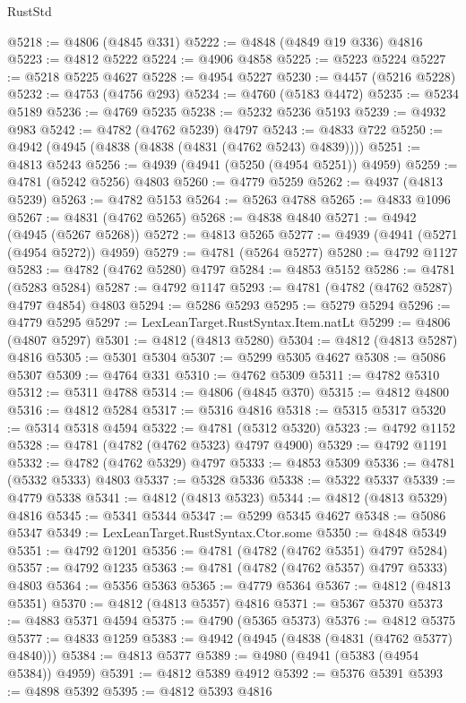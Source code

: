 \begin{lexlean}{RustStd}
\begin{coremodule}
@5218 := @4806 (@4845 @331)
@5222 := @4848 (@4849 @19 @336) @4816
@5223 := @4812 @5222
@5224 := @4906 @4858
@5225 := @5223 @5224
@5227 := @5218 @5225 @4627
@5228 := @4954 @5227
@5230 := @4457 (@5216 @5228)
@5232 := @4753 (@4756 @293)
@5234 := @4760 (@5183 @4472)
@5235 := @5234 @5189
@5236 := @4769 @5235
@5238 := @5232 @5236 @5193
@5239 := @4932 @983
@5242 := @4782 (@4762 @5239) @4797
@5243 := @4833 @722
@5250 := @4942 (@4945 (@4838 (@4838 (@4831 (@4762 @5243) @4839))))
@5251 := @4813 @5243
@5256 := @4939 (@4941 (@5250 (@4954 @5251)) @4959)
@5259 := @4781 (@5242 @5256) @4803
@5260 := @4779 @5259
@5262 := @4937 (@4813 @5239)
@5263 := @4782 @5153
@5264 := @5263 @4788
@5265 := @4833 @1096
@5267 := @4831 (@4762 @5265)
@5268 := @4838 @4840
@5271 := @4942 (@4945 (@5267 @5268))
@5272 := @4813 @5265
@5277 := @4939 (@4941 (@5271 (@4954 @5272)) @4959)
@5279 := @4781 (@5264 @5277)
@5280 := @4792 @1127
@5283 := @4782 (@4762 @5280) @4797
@5284 := @4853 @5152
@5286 := @4781 (@5283 @5284)
@5287 := @4792 @1147
@5293 := @4781 (@4782 (@4762 @5287) @4797 @4854) @4803
@5294 := @5286 @5293
@5295 := @5279 @5294
@5296 := @4779 @5295
@5297 := LexLeanTarget.RustSyntax.Item.natLt
@5299 := @4806 (@4807 @5297)
@5301 := @4812 (@4813 @5280)
@5304 := @4812 (@4813 @5287) @4816
@5305 := @5301 @5304
@5307 := @5299 @5305 @4627
@5308 := @5086 @5307
@5309 := @4764 @331
@5310 := @4762 @5309
@5311 := @4782 @5310
@5312 := @5311 @4788
@5314 := @4806 (@4845 @370)
@5315 := @4812 @4800
@5316 := @4812 @5284
@5317 := @5316 @4816
@5318 := @5315 @5317
@5320 := @5314 @5318 @4594
@5322 := @4781 (@5312 @5320)
@5323 := @4792 @1152
@5328 := @4781 (@4782 (@4762 @5323) @4797 @4900)
@5329 := @4792 @1191
@5332 := @4782 (@4762 @5329) @4797
@5333 := @4853 @5309
@5336 := @4781 (@5332 @5333) @4803
@5337 := @5328 @5336
@5338 := @5322 @5337
@5339 := @4779 @5338
@5341 := @4812 (@4813 @5323)
@5344 := @4812 (@4813 @5329) @4816
@5345 := @5341 @5344
@5347 := @5299 @5345 @4627
@5348 := @5086 @5347
@5349 := LexLeanTarget.RustSyntax.Ctor.some
@5350 := @4848 @5349
@5351 := @4792 @1201
@5356 := @4781 (@4782 (@4762 @5351) @4797 @5284)
@5357 := @4792 @1235
@5363 := @4781 (@4782 (@4762 @5357) @4797 @5333) @4803
@5364 := @5356 @5363
@5365 := @4779 @5364
@5367 := @4812 (@4813 @5351)
@5370 := @4812 (@4813 @5357) @4816
@5371 := @5367 @5370
@5373 := @4883 @5371 @4594
@5375 := @4790 (@5365 @5373)
@5376 := @4812 @5375
@5377 := @4833 @1259
@5383 := @4942 (@4945 (@4838 (@4831 (@4762 @5377) @4840)))
@5384 := @4813 @5377
@5389 := @4980 (@4941 (@5383 (@4954 @5384)) @4959)
@5391 := @4812 @5389 @4912
@5392 := @5376 @5391
@5393 := @4898 @5392
@5395 := @4812 @5393 @4816

\end{coremodule}
\end{lexlean}

